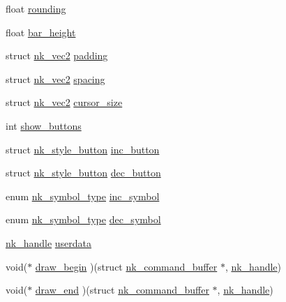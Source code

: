\begin{DoxyCompactItemize}
\item 
float \mbox{\hyperlink{structnk__style__slider_a950d2cbcc0c1b9dadf2a2c47b00fef4a}{rounding}}
\item 
float \mbox{\hyperlink{structnk__style__slider_a3c1f505c59eda0537441eb8e6d8c61e1}{bar\+\_\+height}}
\item 
struct \mbox{\hyperlink{structnk__vec2}{nk\+\_\+vec2}} \mbox{\hyperlink{structnk__style__slider_a90c7b4d5cb928cf549eb76ec88f79dfd}{padding}}
\item 
struct \mbox{\hyperlink{structnk__vec2}{nk\+\_\+vec2}} \mbox{\hyperlink{structnk__style__slider_a24853b62553da926bd2476e5305f27d4}{spacing}}
\item 
struct \mbox{\hyperlink{structnk__vec2}{nk\+\_\+vec2}} \mbox{\hyperlink{structnk__style__slider_aedeb3490702bb178183e1a061bab2dcb}{cursor\+\_\+size}}
\item 
int \mbox{\hyperlink{structnk__style__slider_a017823e8257d836b5b6b97433548039f}{show\+\_\+buttons}}
\item 
struct \mbox{\hyperlink{structnk__style__button}{nk\+\_\+style\+\_\+button}} \mbox{\hyperlink{structnk__style__slider_a7d7bce402c16ed819a64c72b5ee1928f}{inc\+\_\+button}}
\item 
struct \mbox{\hyperlink{structnk__style__button}{nk\+\_\+style\+\_\+button}} \mbox{\hyperlink{structnk__style__slider_a2af42be5c477ddda05dde36d45fbebe4}{dec\+\_\+button}}
\item 
enum \mbox{\hyperlink{nuklear_8h_a29b4aaa400d0ce28aea3c8c9c372ac07}{nk\+\_\+symbol\+\_\+type}} \mbox{\hyperlink{structnk__style__slider_a82d0f1a7c09ae08a0462047b1c4d035d}{inc\+\_\+symbol}}
\item 
enum \mbox{\hyperlink{nuklear_8h_a29b4aaa400d0ce28aea3c8c9c372ac07}{nk\+\_\+symbol\+\_\+type}} \mbox{\hyperlink{structnk__style__slider_a4974ffb84ecb0c34afc3b608e34bc339}{dec\+\_\+symbol}}
\item 
\mbox{\hyperlink{unionnk__handle}{nk\+\_\+handle}} \mbox{\hyperlink{structnk__style__slider_a6376ac01b14a9da29af611b9d2aeecd2}{userdata}}
\item 
void($\ast$ \mbox{\hyperlink{structnk__style__slider_a32d89881002446f40c03ff457a400bc5}{draw\+\_\+begin}} )(struct \mbox{\hyperlink{structnk__command__buffer}{nk\+\_\+command\+\_\+buffer}} $\ast$, \mbox{\hyperlink{unionnk__handle}{nk\+\_\+handle}})
\item 
void($\ast$ \mbox{\hyperlink{structnk__style__slider_a821c8a395eb26c6bd6089d75fc197881}{draw\+\_\+end}} )(struct \mbox{\hyperlink{structnk__command__buffer}{nk\+\_\+command\+\_\+buffer}} $\ast$, \mbox{\hyperlink{unionnk__handle}{nk\+\_\+handle}})
\end{DoxyCompactItemize}


